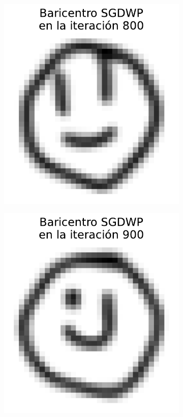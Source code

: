 \begin{figure}[H]
\begin{subfigure}[b]{0.17\textwidth}
        \includegraphics[width=\textwidth]{img/sgdwp-rw/bar-SGDWP-random-walk-iter-08.pdf}
        \label{fig:bar-SGDWP-random-walk-iter-08}
    \end{subfigure}
    \hfill
    \begin{subfigure}[b]{0.17\textwidth}
        \centering
        \includegraphics[width=\textwidth]{img/sgdwp-rw/bar-SGDWP-random-walk-iter-09.pdf}

\end{subfigure}
\end{figure}
